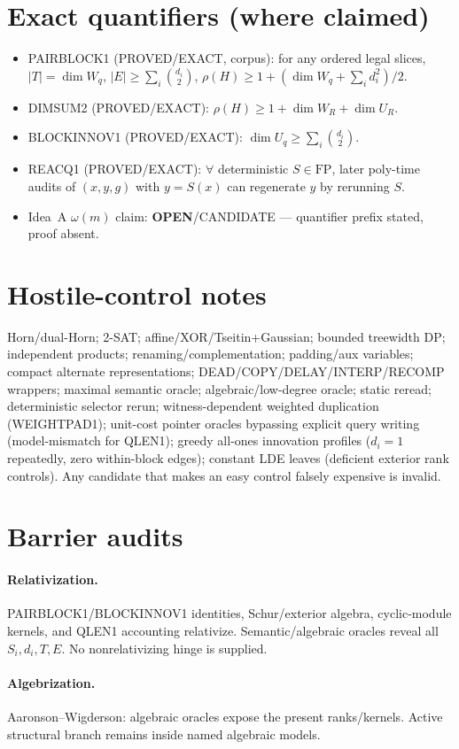 \documentclass[11pt]{article}
\begin{document}
\section*{Exact quantifiers (where claimed)}
\begin{itemize}
\item PAIRBLOCK1 (PROVED/EXACT, corpus): for any ordered legal slices,
$|T|=\dim W_q$, $|E|\ge\sum_i\binom{d_i}{2}$,
$\rho(H)\ge 1+(\dim W_q+\sum_i d_i^2)/2$.
\item DIMSUM2 (PROVED/EXACT): $\rho(H)\ge 1+\dim W_R+\dim U_R$.
\item BLOCKINNOV1 (PROVED/EXACT): $\dim U_q\ge\sum_i\binom{d_i}{2}$.
\item REACQ1 (PROVED/EXACT): $\forall$ deterministic $S\in\mathrm{FP}$, later poly-time audits
of $(x,y,g)$ with $y=S(x)$ can regenerate $y$ by rerunning $S$.
\item Idea~A $\omega(m)$ claim: \textbf{OPEN}/CANDIDATE --- quantifier prefix stated, proof absent.
\end{itemize}

\section*{Hostile-control notes}
Horn/dual-Horn; 2-SAT; affine/XOR/Tseitin+Gaussian; bounded treewidth DP; independent products;
renaming/complementation; padding/aux variables; compact alternate representations;
DEAD/COPY/DELAY/INTERP/RECOMP wrappers; maximal semantic oracle; algebraic/low-degree oracle;
static reread; deterministic selector rerun; witness-dependent weighted duplication (WEIGHTPAD1);
unit-cost pointer oracles bypassing explicit query writing (model-mismatch for QLEN1);
greedy all-ones innovation profiles ($d_i=1$ repeatedly, zero within-block edges);
constant LDE leaves (deficient exterior rank controls).
Any candidate that makes an easy control falsely expensive is invalid.

\section*{Barrier audits}
\paragraph{Relativization.}
PAIRBLOCK1/BLOCKINNOV1 identities, Schur/exterior algebra, cyclic-module kernels, and QLEN1
accounting relativize. Semantic/algebraic oracles reveal all $S_i,d_i,T,E$. No nonrelativizing
hinge is supplied.
\paragraph{Algebrization.}
Aaronson--Wigderson: algebraic oracles expose the present ranks/kernels. Active structural
branch remains inside named algebraic models.
\end{document}
